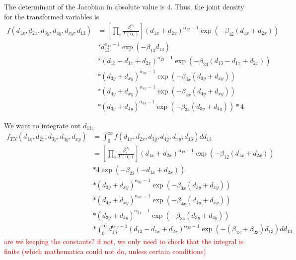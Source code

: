 \documentclass[12pt,letterpaper]{article}
\newcommand{\falta}[1]{\textcolor{red}{#1}}
\begin{document}
\begin{enumerate}
  The determinant of the Jacobian in absolute value is $4$. Thus, the
  joint density for the transformed variables is
  \begin{align*}
    f(d_{1x},d_{2x},d_{3y},d_{4y},d_{xy},d_{13}) &=
    \left[ \prod_i \frac{\beta_i^{\alpha_i}}{\Gamma(\alpha_i)} \right] (d_{1x}+d_{2x})^{\alpha_{12}-1}
    \exp{(-\beta_{12}(d_{1x}+d_{2x}))} \\
    &* d_{13}^{\alpha_{13}-1}\exp{(-\beta_{13}d_{13})} \\
    &* (d_{13}-d_{1x}+d_{2x})^{\alpha_{23}-1}\exp{(-\beta_{23}(d_{13}-d_{1x}+d_{2x}))}\\
    &* (d_{3y}+d_{xy})^{\alpha_{3x}-1}\exp{(-\beta_{3x}(d_{3y}+d_{xy}))} \\
    &*(d_{4y}+d_{xy})^{\alpha_{4x}-1}\exp{(-\beta_{4x}(d_{4y}+d_{xy}))} \\
    &* (d_{3y}+d_{4y})^{\alpha_{34}-1}\exp{(-\beta_{34}(d_{3y}+d_{4y}))} *4
  \end{align*}

  We want to integrate out $d_{13}$,
  \begin{align*}
    f_{TN}(d_{1x},d_{2x},d_{3y},d_{4y},d_{xy}) &= \int_0^\infty
    f(d_{1x},d_{2x},d_{3y},d_{4y},d_{xy},d_{13}) d d_{13} \\
    &=\left[ \prod_i \frac{\beta_i^{\alpha_i}}{\Gamma(\alpha_i)} \right] (d_{1x}+d_{2x})^{\alpha_{12}-1}
    \exp{(-\beta_{12}(d_{1x}+d_{2x}))} \\
    &* 4\exp{(-\beta_{23}(-d_{1x}+d_{2x}))}\\
    &* (d_{3y}+d_{xy})^{\alpha_{3x}-1}\exp{(-\beta_{3x}(d_{3y}+d_{xy}))} \\
    &*(d_{4y}+d_{xy})^{\alpha_{4x}-1}\exp{(-\beta_{4x}(d_{4y}+d_{xy}))} \\
    &*(d_{3y}+d_{4y})^{\alpha_{34}-1}\exp{(-\beta_{34}(d_{3y}+d_{4y}))} \\
    &* \int_0^\infty
    d_{13}^{\alpha_{13}-1}(d_{13}-d_{1x}+d_{2x})^{\alpha_{23}-1}\exp{(-(\beta_{13}+\beta_{23})d_{13})}
    d d_{13}
  \end{align*}
  \falta{are we keeping the constants? if not, we only need to check
    that the integral is finite (which mathematica could not do,
    unless certain conditions)}

\end{enumerate}
\end{document}
